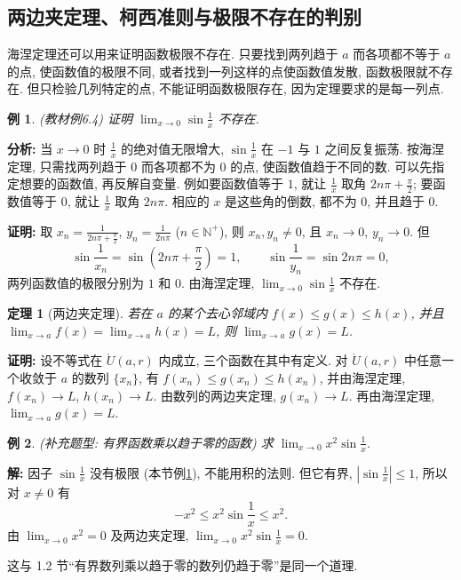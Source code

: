 \documentclass[UTF8,openany]{ctexbook}
\theoremstyle{chinesetextbook}
\newtheorem{example}{例}[section]
\newtheorem{theorem}{定理}[section]
\newenvironment{cnproof}{\par\indent\textbf{证明:} \ignorespaces}{\par}
\newenvironment{cnsolution}{\par\indent\textbf{解:} \ignorespaces}{\par}
\begin{document}
\subsection{两边夹定理、柯西准则与极限不存在的判别}
海涅定理还可以用来证明函数极限不存在. 只要找到两列趋于 $a$ 而各项都不等于 $a$ 的点, 使函数值的极限不同, 或者找到一列这样的点使函数值发散, 函数极限就不存在. 但只检验几列特定的点, 不能证明函数极限存在, 因为定理要求的是每一列点.
\begin{example}\label{ex:6-4}
\textnormal{(教材例6.4)} 证明 $\displaystyle\lim_{x\to0}\sin\frac1x$ 不存在.
\end{example}
\par\indent\textbf{分析:} 当 $x\to0$ 时 $\displaystyle\frac1x$ 的绝对值无限增大, $\displaystyle\sin\frac1x$ 在 $-1$ 与 $1$ 之间反复振荡. 按海涅定理, 只需找两列趋于 $0$ 而各项都不为 $0$ 的点, 使函数值趋于不同的数. 可以先指定想要的函数值, 再反解自变量. 例如要函数值等于 $1$, 就让 $\displaystyle\frac1x$ 取角 $\displaystyle2n\pi+\frac\pi2$; 要函数值等于 $0$, 就让 $\displaystyle\frac1x$ 取角 $2n\pi$. 相应的 $x$ 是这些角的倒数, 都不为 $0$, 并且趋于 $0$.
\begin{cnproof}
取 $\displaystyle x_n=\frac1{2n\pi+\frac\pi2}$, $\displaystyle y_n=\frac1{2n\pi}$ ($n\in\mathbb N^+$), 则 $x_n,y_n\ne0$, 且 $x_n\to0$, $y_n\to0$. 但
\[
\sin\frac1{x_n}=\sin\left(2n\pi+\frac\pi2\right)=1,\qquad\sin\frac1{y_n}=\sin2n\pi=0,
\]
两列函数值的极限分别为 $1$ 和 $0$. 由海涅定理, $\displaystyle\lim_{x\to0}\sin\frac1x$ 不存在.
\end{cnproof}
\begin{theorem}[两边夹定理]
若在 $a$ 的某个去心邻域内 $f(x)\le g(x)\le h(x)$, 并且 $\displaystyle\lim_{x\to a}f(x)=\lim_{x\to a}h(x)=L$, 则 $\displaystyle\lim_{x\to a}g(x)=L$.
\end{theorem}
\begin{cnproof}
设不等式在 $\mathring U(a,r)$ 内成立, 三个函数在其中有定义. 对 $\mathring U(a,r)$ 中任意一个收敛于 $a$ 的数列 $\{x_n\}$, 有 $f(x_n)\le g(x_n)\le h(x_n)$, 并由海涅定理, $f(x_n)\to L$, $h(x_n)\to L$. 由数列的两边夹定理, $g(x_n)\to L$. 再由海涅定理, $\displaystyle\lim_{x\to a}g(x)=L$.
\end{cnproof}
\begin{example}
\textnormal{(补充题型: 有界函数乘以趋于零的函数)} 求 $\displaystyle\lim_{x\to0}x^2\sin\frac1x$.
\end{example}
\begin{cnsolution}
因子 $\displaystyle\sin\frac1x$ 没有极限 (本节例\ref{ex:6-4}), 不能用积的法则. 但它有界, $\displaystyle\left|\sin\frac1x\right|\le1$, 所以对 $x\ne0$ 有
\[
-x^2\le x^2\sin\frac1x\le x^2.
\]
由 $\displaystyle\lim_{x\to0}x^2=0$ 及两边夹定理, $\displaystyle\lim_{x\to0}x^2\sin\frac1x=0$.
\end{cnsolution}
这与 1.2 节“有界数列乘以趋于零的数列仍趋于零”是同一个道理.
\end{document}
